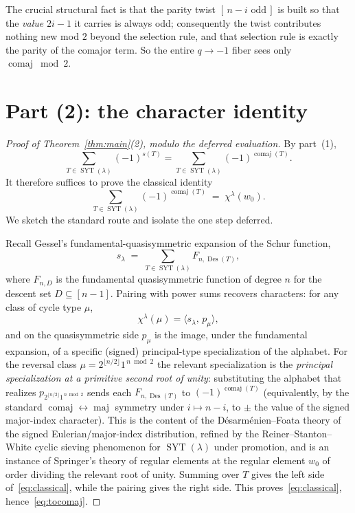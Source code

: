 \documentclass[11pt]{article}
\theoremstyle{definition}
\DeclareMathOperator{\Des}{Des}
\DeclareMathOperator{\maj}{maj}
\DeclareMathOperator{\comaj}{comaj}
\DeclareMathOperator{\SYT}{SYT}
\newcommand{\wzero}{w_0}
\begin{document}
\noindent The crucial structural fact is that the parity twist
$[\,n-i\text{ odd}\,]$ is built so that the \emph{value} $2i-1$ it carries is
always odd; consequently the twist contributes nothing new mod $2$ beyond the
selection rule, and that selection rule is exactly the parity of the comajor
term.  So the entire $q\to-1$ fiber sees only $\comaj\bmod 2$.

\section{Part (2): the character identity}\label{sec:p2}

\begin{proof}[Proof of Theorem~\ref{thm:main}(2), modulo the deferred evaluation]
By part~(1),
\begin{equation}\label{eq:tocomaj}
\sum_{T\in\SYT(\lambda)}(-1)^{s(T)}
=\sum_{T\in\SYT(\lambda)}(-1)^{\comaj(T)}.
\end{equation}
It therefore suffices to prove the classical identity
\begin{equation}\label{eq:classical}
\sum_{T\in\SYT(\lambda)}(-1)^{\comaj(T)}\;=\;\chi^\lambda(\wzero).
\end{equation}
We sketch the standard route and isolate the one step deferred.

Recall Gessel's fundamental-quasisymmetric expansion of the Schur function,
\[
s_\lambda \;=\; \sum_{T\in\SYT(\lambda)} F_{n,\Des(T)},
\]
where $F_{n,D}$ is the fundamental quasisymmetric function of degree $n$ for the
descent set $D\subseteq[n-1]$.  Pairing with power sums recovers characters:
for any class of cycle type $\mu$,
\[
\chi^\lambda(\mu)=\langle s_\lambda,\,p_\mu\rangle,
\]
and on the quasisymmetric side $p_\mu$ is the image, under the fundamental
expansion, of a specific (signed) principal-type specialization of the alphabet.
For the reversal class $\mu=2^{\lfloor n/2\rfloor}1^{\,n\bmod2}$ the relevant
specialization is the \emph{principal specialization at a primitive second root of
unity}: substituting the alphabet that realizes $p_{2^{\lfloor n/2\rfloor}1^{\,n\bmod2}}$
sends each $F_{n,\Des(T)}$ to $(-1)^{\comaj(T)}$ (equivalently, by the standard
$\comaj\leftrightarrow\maj$ symmetry under $i\mapsto n-i$, to $\pm$ the value of the
signed major-index character).  This is the content of the Désarménien--Foata
theory of the signed Eulerian/major-index distribution, refined by the
Reiner--Stanton--White cyclic sieving phenomenon for $\SYT(\lambda)$ under
promotion, and is an instance of Springer's theory of regular elements at the
regular element $\wzero$ of order dividing the relevant root of unity.  Summing
over $T$ gives the left side of~\eqref{eq:classical}, while the pairing gives the
right side.  This proves~\eqref{eq:classical}, hence~\eqref{eq:tocomaj}.
\end{proof}
\end{document}

